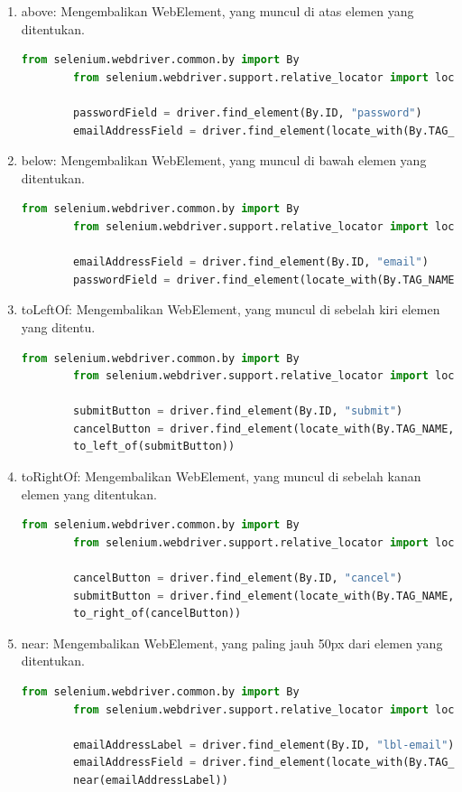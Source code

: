\begin{enumerate}
	\item above: Mengembalikan WebElement, yang muncul di atas elemen yang ditentukan.
	\begin{lstlisting}[language=python, caption=Contoh kode Pencari Relatif Above, label=kode:2:above]
		from selenium.webdriver.common.by import By
		from selenium.webdriver.support.relative_locator import locate_with
		
		passwordField = driver.find_element(By.ID, "password")
		emailAddressField = driver.find_element(locate_with(By.TAG_NAME, "input").above(passwordField))
	\end{lstlisting}
	\item below: Mengembalikan WebElement, yang muncul di bawah elemen yang ditentukan.
	\begin{lstlisting}[language=python, caption=Contoh kode Pencari Relatif Below, label=kode:2:below]
		from selenium.webdriver.common.by import By
		from selenium.webdriver.support.relative_locator import locate_with
		
		emailAddressField = driver.find_element(By.ID, "email")
		passwordField = driver.find_element(locate_with(By.TAG_NAME, "input").below(emailAddressField))
	\end{lstlisting}
	\item toLeftOf: Mengembalikan WebElement, yang muncul di sebelah kiri elemen yang ditentu.
	\begin{lstlisting}[language=python, caption=Contoh kode Pencari Relatif toLeftOf, label=kode:2:left]
		from selenium.webdriver.common.by import By
		from selenium.webdriver.support.relative_locator import locate_with
		
		submitButton = driver.find_element(By.ID, "submit")
		cancelButton = driver.find_element(locate_with(By.TAG_NAME, "button").
		to_left_of(submitButton))
	\end{lstlisting}
	\item toRightOf: Mengembalikan WebElement, yang muncul di sebelah kanan elemen yang ditentukan.
	\begin{lstlisting}[language=python, caption=Contoh kode Pencari Relatif toRightOf, label=kode:2:right]
		from selenium.webdriver.common.by import By
		from selenium.webdriver.support.relative_locator import locate_with
		
		cancelButton = driver.find_element(By.ID, "cancel")
		submitButton = driver.find_element(locate_with(By.TAG_NAME, "button").
		to_right_of(cancelButton))
	\end{lstlisting}
	\item near: Mengembalikan WebElement, yang paling jauh 50px dari elemen yang ditentukan.
	\begin{lstlisting}[language=python, caption=Contoh kode Pencari Relatif Near, label=kode:2:near]
		from selenium.webdriver.common.by import By
		from selenium.webdriver.support.relative_locator import locate_with
		
		emailAddressLabel = driver.find_element(By.ID, "lbl-email")
		emailAddressField = driver.find_element(locate_with(By.TAG_NAME, "input").
		near(emailAddressLabel))
	\end{lstlisting}
\end{enumerate}	











